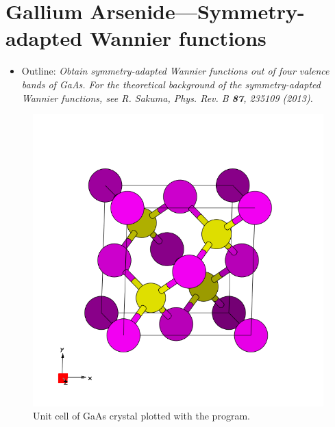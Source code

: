 \section{Gallium Arsenide---Symmetry-adapted Wannier functions}
\label{sec21:GaAsSA}

\begin{itemize}
	\item Outline: {\it Obtain symmetry-adapted Wannier functions out of four valence bands of GaAs. For
the theoretical background of the symmetry-adapted Wannier functions, see R. Sakuma, Phys.
Rev. B \textbf{87}, 235109 (2013).}
\end{itemize}

\begin{figure}[h!]
\centering
\includegraphics[width=0.25\columnwidth,trim={55pt 55pt 55pt 55pt},clip]{figure/example01/GaAs.png}
\caption{Unit cell of GaAs crystal plotted with the \xcrysden{} program.}
\label{fig21}
\end{figure}

